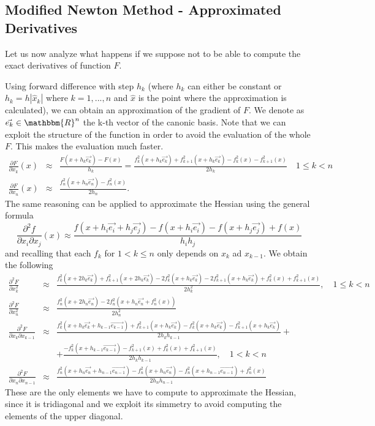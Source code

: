 \medskip
\subsection*{Modified Newton Method - Approximated Derivatives}
Let us now analyze what happens if we suppose not to be able to compute the exact derivatives of function $F$.

Using forward difference with step $h_k$ (where $h_k$ can either be constant or $h_k=h|\hat{x}_k|$ where $k=1,...,n$ and $\hat{x}$ is the point 
where the approximation is calculated), we can obtain an approximation of the gradient of $F$. We denote as $\vec{e_k} \in \mathbbm{R}^n$ the k-th vector of the canonic basis. 
Note that we can exploit the structure of the function
in order to avoid the evaluation of the whole $F$. This makes the evaluation much faster.
\begin{eqnarray*}
    \frac{\partial F}{\partial x_k}(x) &\approx& \frac{F(x+h_k \vec{e_k})-F(x)}{h_k} 
    = \frac{f_k^2(x+h_k \vec{e_k}) +f_{k+1}^2(x+h_k\vec{e_k}) -f_k^2(x) -f_{k+1}^2(x) }{2h_k} \quad 1\leq k<n \\
    \frac{\partial F}{\partial x_n}(x) &\approx& \frac{f_n^2(x+h_n\vec{e_n}) - f_n^2(x)}{2h_n}.
\end{eqnarray*}
The same reasoning can be applied to approximate the Hessian using the general formula 
$$\frac{\partial^2 f}{\partial x_i \partial x_j} (x) \approx \frac{f(x+h_i\vec{e_i}+h_j\vec{e_j}) - f(x+h_i\vec{e_i}) - f(x+h_j\vec{e_j}) + f(x) }{h_ih_j}$$
and recalling that each $f_k$ for $1<k\leq n$ only depends on $x_k$ ad $x_{k-1}$. We obtain the following 
\begin{eqnarray*}
    \frac{\partial^2 F}{\partial x_k^2} &\approx& \frac{f_k^2(x+2h_k\vec{e_k}) + f_{k+1}^2(x+2h_k\vec{e_k}) -2f_k^2(x+h_k\vec{e_k}) -2f_{k+1}^2(x+h_k\vec{e_k}) +f_k^2(x) + f_{k+1}^2(x) }{2h_k^2}, \quad 1 \leq k <n \\
    \frac{\partial^2 F}{\partial x_n^2} &\approx& \frac{f_n^2(x+2h_n\vec{e_n}) - 2f_n^2(x+h_n\vec{e_n} + f_n^2(x)) }{2h_n^2} \\
    \frac{\partial^2 F}{\partial x_k \partial x_{k-1}} &\approx& \frac{f_k^2(x+h_k\vec{e_k}+h_{k-1}\vec{e_{k-1}}) + f_{k+1}^2(x+h_k\vec{e_k}) -f_k^2(x+h_k\vec{e_k}) -f_{k+1}^2(x+h_k\vec{e_k})}{2h_k h_{k-1}} + \\
    && + \frac{ -f_k^2(x+h_{k-1}\vec{e_{k-1}}) -f_{k+1}^2(x) +f_k^2(x) + f_{k+1}^2(x) }{2h_k h_{k-1}}, \quad 1<k<n \\
    \frac{\partial^2 F}{\partial x_n \partial x_{n-1}} &\approx& \frac{f_n^2(x+h_n\vec{e_n}+h_{n-1}\vec{e_{n-1}}) -f_n^2(x+h_n\vec{e_n}) -f_n^2(x+h_{n-1}\vec{e_{n-1}}) +f_n^2(x) }{2h_n h_{n-1}}
\end{eqnarray*}
These are the only elements we have to compute to approximate the Hessian, since it is tridiagonal and we exploit its simmetry to avoid computing 
the elements of the upper diagonal.
